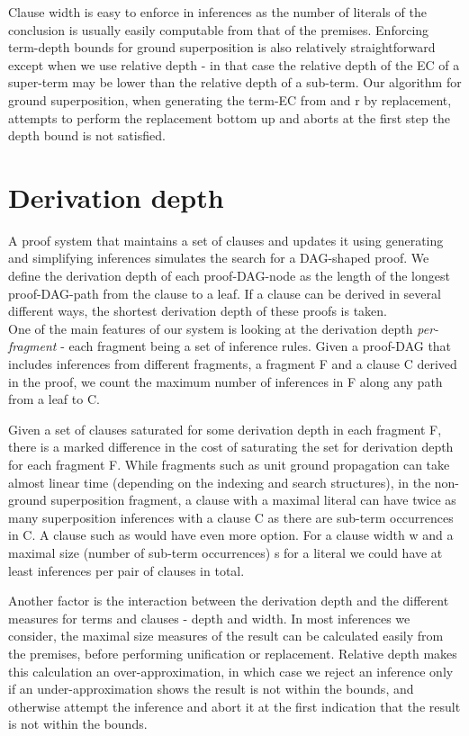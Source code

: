 Clause width is easy to enforce in inferences as the number of literals of the conclusion is usually easily computable from that of the premises. Enforcing term-depth bounds for ground superposition is also relatively straightforward except when we use relative depth - in that case the relative depth of the EC of a super-term may be lower than the relative depth of a sub-term. 
Our algorithm for ground superposition, when generating the term-EC  from  and r by replacement, attempts to perform the replacement bottom up and aborts at the first step the depth bound is not satisfied.

\section{Derivation depth}\label{section:derivation_depth}
A proof system that maintains a set of clauses and updates it using generating and simplifying inferences simulates the search for a DAG-shaped proof. We define the derivation depth of each proof-DAG-node as the length of the longest proof-DAG-path from the clause to a leaf. 
If a clause can be derived in several different ways, the shortest derivation depth of these proofs is taken.\\
One of the main features of our system is looking at the derivation depth \emph{per-fragment} - each fragment being a set of inference rules. Given a proof-DAG that includes inferences from different fragments, a fragment F and a clause C derived in the proof, we count the maximum number of inferences in F along any path from a leaf to C. 

Given a set of clauses saturated for some derivation depth  in each fragment F, 
there is a marked difference in the cost of saturating the set for derivation depth  for each fragment F.
While fragments such as unit ground propagation can take almost linear time (depending on the indexing and search structures), 
in the non-ground superposition fragment, a clause with a maximal literal  can have twice as many superposition inferences with a clause C as there are sub-term occurrences in C. A clause such as  would have even more option.
For a clause width w and a maximal size (number of sub-term occurrences) s for a literal we could have at least  inferences per pair of clauses in total.

Another factor is the interaction between the derivation depth and the different measures for terms and clauses - depth and width. In most inferences we consider, the maximal size measures of the result can be calculated easily from the premises, before performing unification or replacement. Relative depth makes this calculation an over-approximation, in which case we reject an inference only if an under-approximation shows the result is not within the bounds, and otherwise attempt the inference and abort it at the first indication that the result is not within the bounds.

